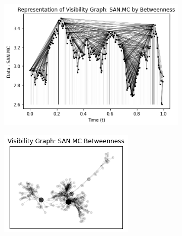 \documentclass[12pt,a4paper]{article}
\begin{document}
\begin{figure}[H]
\centering
\begin{subfigure}{.5\textwidth}
  \centering
  \includegraphics[width=.9\linewidth]{grafo de visibilidad (2)}
  \label{fig:sub1}
\end{subfigure}%
\begin{subfigure}{.5\textwidth}
  \centering
  \includegraphics[width=.9\linewidth]{grafo de visibilidad (1)}
  \label{fig:sub2}
\end{subfigure}
\end{figure}
			
\end{document}
